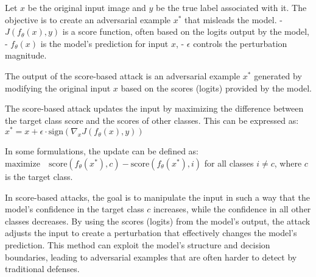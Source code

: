 Let $x$ be the original input image and $y$ be the true label associated with it. The objective is to create an adversarial example $x^*$ that misleads the model.
- $J(f_\theta(x), y)$ is a score function, often based on the logits output by the model,
- $f_\theta(x)$ is the model's prediction for input $x$,
- $\epsilon$ controls the perturbation magnitude.

The output of the score-based attack is an adversarial example $x^*$ generated by modifying the original input $x$ based on the scores (logits) provided by the model.

The score-based attack updates the input by maximizing the difference between the target class score and the scores of other classes. This can be expressed as:
$x^* = x + \epsilon \cdot \text{sign}(\nabla_x J(f_\theta(x), y))$

In some formulations, the update can be defined as:
$\text{maximize} \quad \text{score}(f_\theta(x^*), c) - \text{score}(f_\theta(x^*), i)$
for all classes $i \neq c$, where $c$ is the target class.

In score-based attacks, the goal is to manipulate the input in such a way that the model's confidence in the target class $c$ increases, while the confidence in all other classes decreases. By using the scores (logits) from the model's output, the attack adjusts the input to create a perturbation that effectively changes the model's prediction. This method can exploit the model's structure and decision boundaries, leading to adversarial examples that are often harder to detect by traditional defenses.
